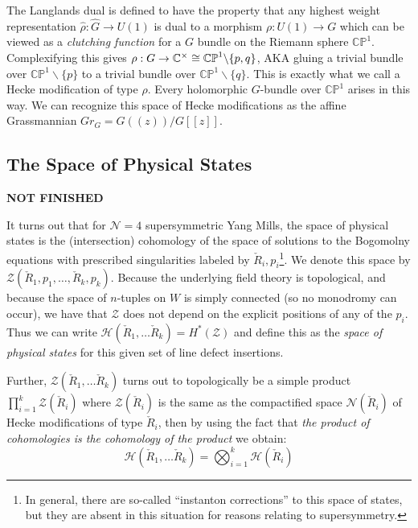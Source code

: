 	The Langlands dual is defined to have the property that any highest weight representation $\hat \rho: \hat G \to U(1)$ is dual to a morphism $\rho: U(1) \to G$ which can be viewed as a \emph{clutching function} for a $G$ bundle on the Riemann sphere $\mathbb{CP}^1$. Complexifying this gives $\rho: G \to \mathbb{C}^\times \cong \mathbb{CP}^1 \backslash \{p, q \}$, AKA gluing a trivial bundle over $\mathbb{CP}^1 \backslash \{p \}$ to a trivial bundle over $\mathbb{CP}^1 \backslash \{q \}$. This is exactly what we call a Hecke modification of type $\rho$. Every holomorphic $G$-bundle over $\mathbb{CP}^1$ arises in this way. We can recognize this space of Hecke modifications as the affine Grassmannian $Gr_G = G((z))/G[[z]]$.

	\subsection{The Space of Physical States}
	
	\textbf{NOT FINISHED}
	
	It turns out that for $\mathcal N = 4$ supersymmetric Yang Mills, the space of physical states is the (intersection) cohomology of the space of solutions to the Bogomolny equations with prescribed singularities labeled by $\check R_i, p_i$\footnote{In general, there are so-called ``instanton corrections'' to this space of states, but they are absent in this situation for reasons relating to supersymmetry.}. We denote this space by $\mathcal Z(\check R_1, p_1, \dots, \check R_k, p_k)$. Because the underlying field theory is topological, and because the space of $n$-tuples on $W$ is simply connected (so no monodromy can occur), we have that $\mathcal Z$ does not depend on the explicit positions of any of the $p_i$. Thus we can write $\mathcal H (\check R_1, \dots \check R_k) = H^*(\mathcal Z)$ and define this as the \emph{space of physical states} for this given set of line defect insertions.
	
	Further, $\mathcal Z(\check R_1, \dots \check R_k)$ turns out to topologically be a simple product $\prod_{i=1}^k \mathcal Z(\check R_i)$ where $\mathcal Z(\check R_i)$ is the same as the compactified space $\mathcal N(\check R_i)$ of Hecke modifications of type $\check R_i$, then by using the fact that \emph{the product of cohomologies is the cohomology of the product} we obtain:
	\begin{equation}
		\mathcal H(\check R_1, \dots \check R_k) = \bigotimes_{i=1}^k \mathcal H(\check R_i)
	\end{equation}
	
